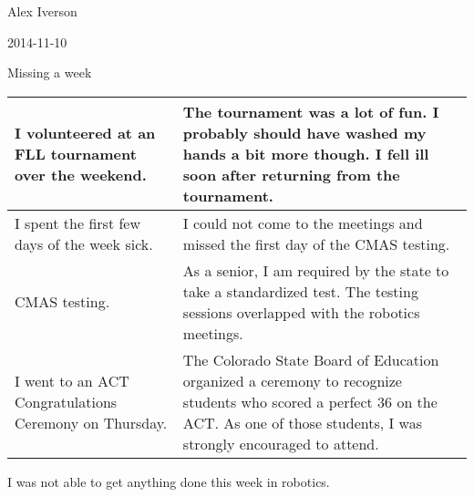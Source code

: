 Alex Iverson

2014-11-10

Missing a week

\begin{tabular}{|p{5cm}|p{5cm}|}
 \hline
 I volunteered at an FLL tournament over the weekend.&
 The tournament was a lot of fun. I probably should have washed my hands a bit more though. I fell ill soon after returning from the tournament.\\
 \hline
 I spent the first few days of the week sick.&
 I could not come to the meetings and missed the first day of the CMAS testing.\\
 \hline
 CMAS testing.&
 As a senior, I am required by the state to take a standardized test. The testing sessions overlapped with the robotics meetings.\\
 \hline
 I went to an ACT Congratulations Ceremony on Thursday.&
 The Colorado State Board of Education organized a ceremony to recognize students who scored a perfect 36 on the ACT. As one of those students, I was strongly encouraged to attend.\\
 \hline
\end{tabular}

I was not able to get anything done this week in robotics.